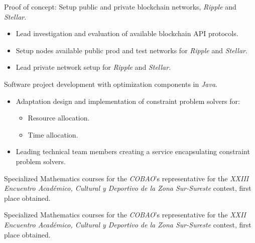 \documentclass[11pt,letter]{moderncv}
\begin{document}
 {Proof of concept: Setup public and private blockchain networks, \emph{Ripple} and \emph{Stellar}.
  \begin{itemize}
  \item Lead investigation and evaluation of available blockchain API protocols.
  \item Setup nodes available public prod and test networks for \emph{Ripple} and \emph{Stellar}.
  \item Lead private network setup for \emph{Ripple} and \emph{Stellar}.
  \end{itemize}
}


 {Software project development with optimization components in {\em Java}.
  \begin{itemize}
  \item Adaptation design and implementation of constraint problem solvers for:
    \begin{itemize}
    \item Resource allocation.
    \item Time allocation.
    \end{itemize}
  \item Leading technical team members creating a service encapsulating constraint problem solvers.
  \end{itemize}
}

 {Specialized Mathematics
  courses for the {\em COBAO}'s representative for the {\em XXIII
    Encuentro Académico, Cultural y Deportivo de la Zona Sur-Sureste}
  contest, first place obtained.}

 {Specialized Mathematics
  courses for the {\em COBAO}'s representative for the {\em XXII
    Encuentro Académico, Cultural y Deportivo de la Zona Sur-Sureste}
  contest, first place obtained.}

\end{document}
